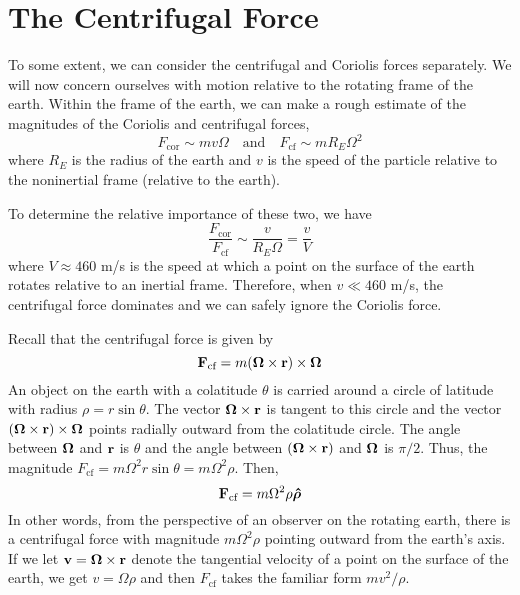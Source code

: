 \section{The Centrifugal Force}
To some extent, we can consider the centrifugal and Coriolis forces separately. We will now concern ourselves with motion relative to the rotating frame of the earth. Within the frame of the earth, we can make a rough estimate of the magnitudes of the Coriolis and centrifugal forces,
\[ F_\text{cor}\sim mv\Omega \quad\text{and}\quad F_\text{cf} \sim mR_E\Omega^2\]
where $R_E$ is the radius of the earth and $v$ is the speed of the particle relative to the noninertial frame (relative to the earth).

To determine the relative importance of these two, we have
\[ \frac{F_\text{cor}}{F_\text{cf}} \sim \frac{v}{R_E\Omega} = \frac{v}{V}\]
where $V\approx 460$ m/s is the speed at which a point on the surface of the earth rotates relative to an inertial frame. Therefore, when $v\ll 460$ m/s, the centrifugal force dominates and we can safely ignore the Coriolis force.

Recall that the centrifugal force is given by
\[ \mathbf{F}_\text{cf} = m(\boldsymbol{\Omega}\times\mathbf{r})\times\boldsymbol{\Omega}\]
An object on the earth with a colatitude $\theta$ is carried around a circle of latitude with radius $\rho = r\sin\theta$. The vector $\boldsymbol{\Omega}\times\mathbf{r}$ is tangent to this circle and the vector $(\boldsymbol{\Omega}\times \mathbf{r})\times \boldsymbol{\Omega}$ points radially outward from the colatitude circle. The angle between $\boldsymbol{\Omega}$ and $\mathbf{r}$ is $\theta$ and the angle between $(\boldsymbol{\Omega}\times\mathbf{r})$ and $\boldsymbol{\Omega}$ is $\pi/2$. Thus, the magnitude $F_\text{cf} = m\Omega^2r\sin\theta = m\Omega^2\rho$. Then,
\[ \mathbf{F}_\text{cf} = m\Omega^2\rho \boldsymbol{\hat \rho} \]
In other words, from the perspective of an observer on the rotating earth, there is a centrifugal force with magnitude $m\Omega^2\rho$ pointing outward from the earth's axis. If we let $\mathbf{v} = \boldsymbol{\Omega}\times\mathbf{r}$ denote the tangential velocity of a point on the surface of the earth, we get $v =\Omega \rho$ and then $F_\text{cf}$ takes the familiar form $mv^2/\rho$.
